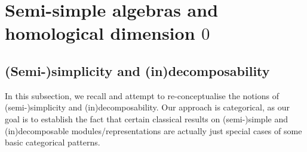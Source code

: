 \section{Semi-simple algebras and homological dimension \texorpdfstring{$0$}{}} \label{section: semi_simple_algebras}
    \subsection{(Semi-)simplicity and (in)decomposability}
        In this subsection, we recall and attempt to re-conceptualise the notions of (semi-)simplicity and (in)decomposability. Our approach is categorical, as our goal is to establish the fact that certain classical results on (semi-)simple and (in)decomposable modules/representations are actually just special cases of some basic categorical patterns. 
    
